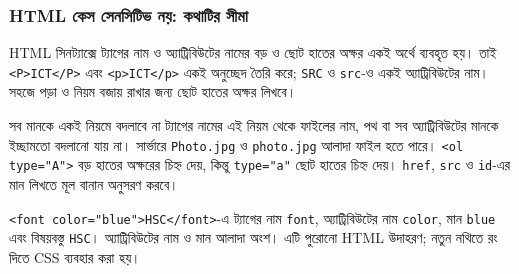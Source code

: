 \subsubsection{HTML কেস সেনসিটিভ নয়: কথাটির সীমা}
HTML সিনট্যাক্সে ট্যাগের নাম ও অ্যাট্রিবিউটের নামের বড় ও ছোট হাতের অক্ষর একই অর্থে ব্যবহৃত হয়। তাই \texttt{<P>ICT</P>} এবং \texttt{<p>ICT</p>} একই অনুচ্ছেদ তৈরি করে; \texttt{SRC} ও \texttt{src}-ও একই অ্যাট্রিবিউটের নাম। সহজে পড়া ও নিয়ম বজায় রাখার জন্য ছোট হাতের অক্ষর লিখবে।

\begin{mistakebox}{সব মানকে একই নিয়মে বদলাবে না}
ট্যাগের নামের এই নিয়ম থেকে ফাইলের নাম, পথ বা সব অ্যাট্রিবিউটের মানকে ইচ্ছামতো বদলানো যায় না। সার্ভারে \texttt{Photo.jpg} ও \texttt{photo.jpg} আলাদা ফাইল হতে পারে। \texttt{<ol type="A">} বড় হাতের অক্ষরের চিহ্ন দেয়, কিন্তু \texttt{type="a"} ছোট হাতের চিহ্ন দেয়। \texttt{href}, \texttt{src} ও \texttt{id}-এর মান লিখতে মূল বানান অনুসরণ করবে।
\end{mistakebox}
\texttt{<font color="blue">HSC</font>}-এ ট্যাগের নাম \texttt{font}, অ্যাট্রিবিউটের নাম \texttt{color}, মান \texttt{blue} এবং বিষয়বস্তু \texttt{HSC}। অ্যাট্রিবিউটের নাম ও মান আলাদা অংশ। এটি পুরোনো HTML উদাহরণ; নতুন নথিতে রং দিতে CSS ব্যবহার করা হয়।

